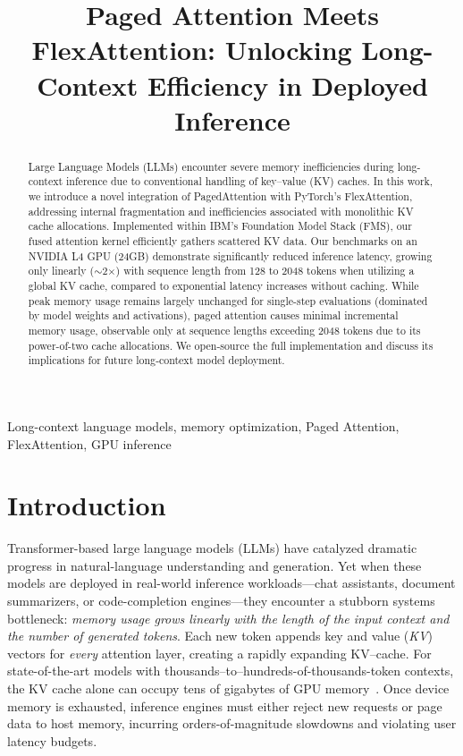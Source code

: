 \documentclass[conference]{IEEEtran}
\title{Paged Attention Meets FlexAttention: Unlocking Long-Context Efficiency in Deployed Inference}
\author{
\IEEEauthorblockN{Thomas Joshi, Herman Saini, Neil Dhillon}
\IEEEauthorblockA{\textit{Columbia University} \\
Email: \{ttj2108, hss2173, nsd2147\}@columbia.edu}
\IEEEauthorblockN{Antoni Viros i Martin, Kaoutar El Maghraoui}
\IEEEauthorblockA{\textit{IBM}}
}
\begin{document}
\maketitle

\begin{abstract}
Large Language Models (LLMs) encounter severe memory inefficiencies during long-context inference due to conventional handling of key–value (KV) caches. In this work, we introduce a novel integration of PagedAttention with PyTorch's FlexAttention, addressing internal fragmentation and inefficiencies associated with monolithic KV cache allocations. Implemented within IBM's Foundation Model Stack (FMS), our fused attention kernel efficiently gathers scattered KV data. Our benchmarks on an NVIDIA L4 GPU (24GB) demonstrate significantly reduced inference latency, growing only linearly ($\sim$2$\times$) with sequence length from 128 to 2048 tokens when utilizing a global KV cache, compared to exponential latency increases without caching. While peak memory usage remains largely unchanged for single-step evaluations (dominated by model weights and activations), paged attention causes minimal incremental memory usage, observable only at sequence lengths exceeding 2048 tokens due to its power-of-two cache allocations. We open‑source the full implementation and discuss its implications for future long‑context model deployment.
\end{abstract}

\begin{IEEEkeywords}
Long-context language models, memory optimization, Paged Attention, FlexAttention, GPU inference
\end{IEEEkeywords}

\section{Introduction}\label{sec:intro}

Transformer-based large language models (LLMs) have catalyzed dramatic progress in natural-language understanding and generation.  Yet when these models are deployed in real-world inference workloads—chat assistants, document summarizers, or code-completion engines—they encounter a stubborn systems bottleneck: \emph{memory usage grows linearly with the length of the input context and the number of generated tokens}.  Each new token appends key and value (\textit{KV}) vectors for \emph{every} attention layer, creating a rapidly expanding KV--cache.  For state-of-the-art models with thousands–to–hundreds-of-thousands-token contexts, the KV cache alone can occupy tens of gigabytes of GPU memory~\cite{dao2022flashattention,kwon2023pagedattention}.  Once device memory is exhausted, inference engines must either reject new requests or page data to host memory, incurring orders-of-magnitude slowdowns and violating user latency budgets.
\end{document}
